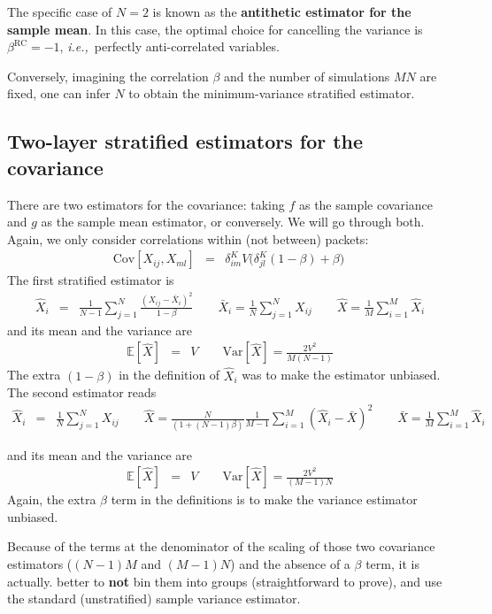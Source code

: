 \documentclass{aastex6}
\newcommand{\ie}{{\textit{i.e.,}~}}
\newcommand{\eqn}[1]{\begin{eqnarray}#1\end{eqnarray}}
\begin{document}
The specific case of $N=2$ is known as the \textbf{antithetic estimator for the sample mean}. In this case, the optimal choice for cancelling the variance is $\beta^\mathrm{RC}=-1$, \ie perfectly anti-correlated variables. 

Conversely, imagining the correlation $\beta$ and the number of simulations $MN$ are fixed, one can infer $N$ to obtain the minimum-variance stratified estimator. 


\subsection{Two-layer stratified estimators for the covariance}

There are two estimators for the covariance: taking $f$ as the sample covariance and $g$ as the sample mean estimator, or conversely. We will go through both. Again, we only consider correlations within (not between) packets:
\eqn{
	\mathrm{Cov}[X_{ij}, X_{ml}] &=& \delta^K_{im} V \bigl(\delta^K_{jl}(1-\beta) + \beta\bigr) \ 
}
The first stratified estimator is
\eqn{
	\hat{X}_i &=& \frac{1}{N-1}\sum_{j=1}^N \frac{(X_{ij} - \bar{X}_{i})^2}{1-\beta}	\quad\quad \bar{X}_{i}	=  \frac{1}{N}\sum_{j=1}^N X_{ij}	\quad\quad \hat{X} =  \frac{1}{M}\sum_{i=1}^M \hat{X}_i 
}
and its mean and the variance are
\eqn{
	\mathbb{E}[\hat{X}] 	&=&	V 	\quad \quad\mathrm{Var}[\hat{X}] = \frac{2V^2}{M(N-1)} 
}
The extra $ (1-\beta)$ in the definition of $\hat{X}_i$ was to make the estimator unbiased.
The second estimator reads
\eqn{
	\hat{X}_i &=& \frac{1}{N}\sum_{j=1}^N X_{ij}	\quad\quad
	\hat{X} =   \frac{N}{(1 + (N-1)\beta)} \frac{1}{M-1}\sum_{i=1}^M (\hat{X}_i  - \bar{X})^2 \quad\quad
	\bar{X} =  \frac{1}{M}\sum_{i=1}^M \hat{X}_i
}

and its mean and the variance are
\eqn{
	\mathbb{E}[\hat{X}] &=& V \quad\quad
	 \mathrm{Var}[\hat{X}] = \frac{2V^2}{(M-1)N} 
}
Again, the extra $\beta$ term in the definitions is to make the variance estimator unbiased. 

Because of the terms at the denominator of the scaling of those two covariance estimators ($(N-1)M $ and $(M-1)N$) and the absence of a $\beta$ term, it is actually. better to \textbf{not} bin them into groups (straightforward to prove), and use the standard (unstratified) sample variance estimator. 
\end{document}
